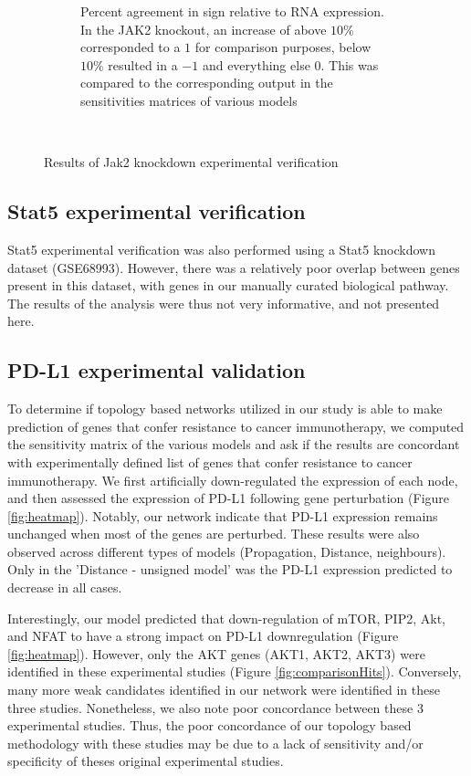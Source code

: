 \documentclass{article}
\begin{document}
\begin{figure}
\begin{subfigure}[b]{0.45\textwidth}
        \caption{Percent agreement in sign relative to RNA expression. In the JAK2 knockout, an increase of above $10\%$ corresponded to a $1$ for comparison purposes, below $10\%$ resulted in a $-1$ and everything else $0$. This was compared to the corresponding output in the sensitivities matrices of various models}
        \label{fig:JAK2_percent}
    \end{subfigure}
    ~ %
    \caption{Results of Jak2 knockdown experimental verification}  
\end{figure}

\subsection{Stat5 experimental verification}
Stat5 experimental verification was also performed using a Stat5 knockdown dataset (GSE68993). However, there was a relatively poor overlap between genes present in this dataset, with genes in our manually curated biological pathway. The results of the analysis were thus not very informative, and not presented here.


\subsection{PD-L1 experimental validation}
To determine if topology based networks utilized in our study is able to make prediction of genes that confer resistance to cancer immunotherapy, we computed the sensitivity matrix of the various models and ask if the results are concordant with experimentally defined list of genes that confer resistance to cancer immunotherapy. We first artificially down-regulated the expression of each node, and then assessed the expression of PD-L1 following gene perturbation (Figure \ref{fig:heatmap}). Notably, our network indicate that PD-L1 expression remains unchanged when most of the genes are perturbed. These results were also observed across different types of models (Propagation, Distance, neighbours). Only in the 'Distance - unsigned model' was the PD-L1 expression predicted to decrease in all cases.

 Interestingly, our model predicted that down-regulation of mTOR, PIP2, Akt, and NFAT to have a strong impact on PD-L1 downregulation (Figure \ref{fig:heatmap}). However, only the AKT genes (AKT1, AKT2, AKT3) were identified in these experimental studies (Figure \ref{fig:comparisonHits}). Conversely, many more weak candidates identified in our network were identified in these three studies. Nonetheless, we also note poor concordance between these 3 experimental studies. Thus, the poor concordance of our topology based methodology with these studies may be due to a lack of sensitivity and/or specificity of theses original experimental studies.
\end{document}
